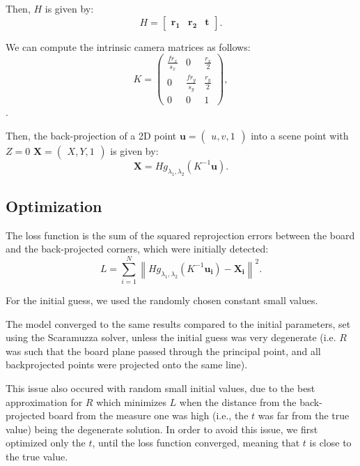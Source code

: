 Then, \(H\) is given by:
\begin{equation}
	H = \begin{bmatrix}
		\mathbf{r_1} & \mathbf{r_2} & \mathbf{t}
	\end{bmatrix}.
\end{equation}

We can compute the intrinsic camera matrices as follows:
\begin{equation}
	K = \begin{pmatrix}
		\frac{f r_x}{s_x} & 0                 & \frac{r_x}{2} \\
		0                 & \frac{f r_y}{s_y} & \frac{r_y}{2} \\
		0                 & 0                 & 1
	\end{pmatrix},
\end{equation}.

Then, the back-projection of a 2D point \(\mathbf{u} = \begin{pmatrix}
	u, v, 1
\end{pmatrix}\) into a scene point with \(Z = 0\) \(\mathbf{X} = \begin{pmatrix}
	X, Y, 1
\end{pmatrix}\) is given by:
\begin{equation}
	\mathbf{X} = H g_{\lambda_1, \lambda_2}(K^{-1} \mathbf{u}).
\end{equation}

\subsection{Optimization}\label{sub:optimization}

The loss function is the sum of the squared reprojection errors between the board and
the back-projected corners, which were initially detected:
\begin{equation}
	L = \sum_{i=1}^{N} \left\lVert
	H g_{\lambda_1, \lambda_2}(K^{-1} \mathbf{u_i}) -
	\mathbf{X_i} \right\rVert^2.
\end{equation}

For the initial guess, we used the randomly chosen constant small values.

The model converged to the same results compared to the initial parameters, set
using the Scaramuzza solver, unless the initial guess was very degenerate (i.e.
\(R\) was such that the board plane passed through the principal point, and all
backprojected points were projected onto the same line).

This issue also occured with random small initial values, due to the best
approximation for \(R\) which minimizes \(L\) when the distance from the
back-projected board from the measure one was high (i.e., the \(t\) was far from
the true value) being the degenerate solution. In order to avoid this issue, we first optimized only the \(t\),
until the loss function converged, meaning that \(t\) is close to the true
value.

